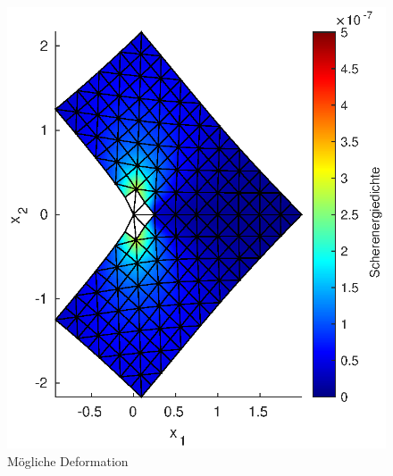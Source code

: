 \documentclass{scrartcl}
\begin{document}
\begin{figure}[h]
\centering
\begin{minipage}[b]{0.45\textwidth}
\centering
\includegraphics[width=1.3\textwidth]{Plots/LShapeBenchmarkDeform4}
\caption{Mögliche Deformation}
\label{pl:LShapeBenchmarkDeform}
\end{minipage}
\hfill
\begin{minipage}[b]{0.45\textwidth}
\centering

\end{minipage}
\end{figure}
\end{document}

